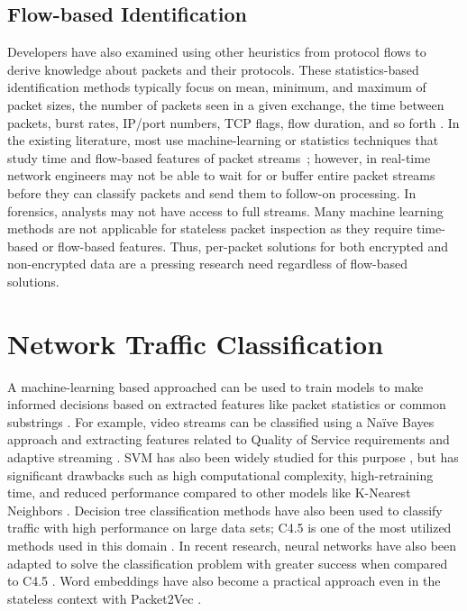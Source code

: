 \subsection{Flow-based Identification}
Developers have also examined using other heuristics from protocol flows to derive knowledge about packets and their protocols. These statistics-based identification methods typically focus on mean, minimum, and maximum of packet sizes, the number of packets seen in a given exchange, the time between packets, burst rates, IP/port numbers, TCP flags, flow duration, and so forth \cite{Moore2013DiscriminatorsFU, ZHAO202122, Paxson}. In the existing literature, most use machine-learning or statistics techniques that study time and flow-based features of packet streams~\cite{Salman, Cao, Lim, LiZ, Song2019, iscx-vpn-paper, iscx-tor-paper}; however, in real-time network engineers may not be able to wait for or buffer entire packet streams before they can classify packets and send them to follow-on processing. In forensics, analysts may not have access to full streams. Many machine learning methods are not applicable for stateless packet inspection as they require time-based or flow-based features. Thus, per-packet solutions for both encrypted and non-encrypted data are a pressing research need regardless of flow-based solutions.

\section{Network Traffic Classification}
A machine-learning based approached can be used to train models to make informed decisions based on extracted features like packet statistics or common substrings \cite{Shim2017SigBoxAS}. For example, video streams can be classified using a Naïve Bayes approach and extracting features related to Quality of Service requirements and adaptive streaming \cite{DIAS2019143}. SVM has also been widely studied for this purpose \cite{LiZ, Cao}, but has significant drawbacks such as high computational complexity, high-retraining time, and reduced performance compared to other models like K-Nearest Neighbors \cite{Salman}. Decision tree classification methods have also been used to classify traffic with high performance on large data sets; C4.5 is one of the most utilized methods used in this domain \cite{Yuan, icissp16}. In recent research, neural networks have also been adapted to solve the classification problem with greater success when compared to C4.5 \cite{Lotfollahi}. Word embeddings have also become a practical approach even in the stateless context with Packet2Vec \cite{packet2vec}.
